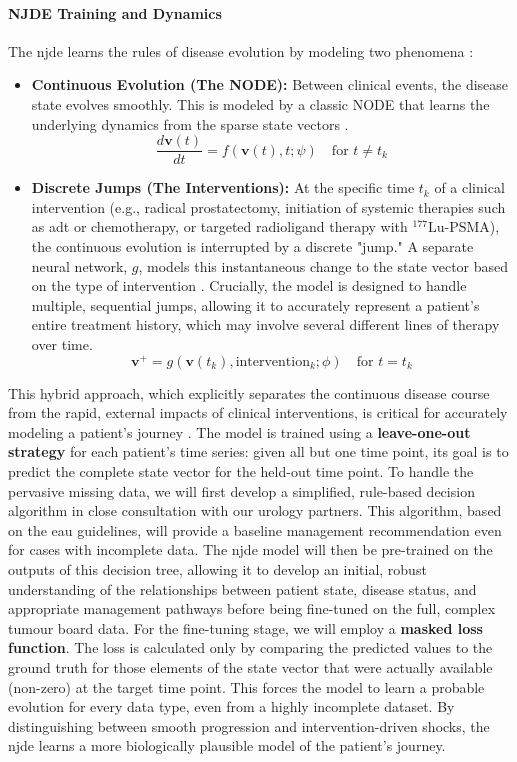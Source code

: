 \documentclass[11pt, a4paper]{article}
\begin{document}
\paragraph{NJDE Training and Dynamics}
The \gls{njde} learns the rules of disease evolution by modeling two phenomena \cite{GwakSim2020}:
\begin{itemize}
    \item \textbf{Continuous Evolution (The NODE):} Between clinical events, the disease state evolves smoothly. This is modeled by a classic NODE that learns the underlying dynamics from the sparse state vectors \cite{BergHasenclever2018}.
    $$ \frac{d\mathbf{v}(t)}{dt} = f(\mathbf{v}(t), t; \psi) \quad \text{for } t \neq t_k $$
    \item \textbf{Discrete Jumps (The Interventions):} At the specific time $t_k$ of a clinical intervention (e.g., radical prostatectomy, initiation of systemic therapies such as \gls{adt} or chemotherapy, or targeted radioligand therapy with $^{\text{177}}\text{Lu-PSMA}$), the continuous evolution is interrupted by a discrete "jump." A separate neural network, $g$, models this instantaneous change to the state vector based on the type of intervention \cite{CuchieroLarsson2019, AbushaqraXue2022}. Crucially, the model is designed to handle multiple, sequential jumps, allowing it to accurately represent a patient's entire treatment history, which may involve several different lines of therapy over time.
    $$ \mathbf{v}^+ = g(\mathbf{v}(t_k), \text{intervention}_k; \phi) \quad \text{for } t = t_k $$
\end{itemize}




This hybrid approach, which explicitly separates the continuous disease course from the rapid, external impacts of clinical interventions, is critical for accurately modeling a patient's journey \cite{GwakSim2020}. The model is trained using a \textbf{leave-one-out strategy} for each patient's time series: given all but one time point, its goal is to predict the complete state vector for the held-out time point. To handle the pervasive missing data, we will first develop a simplified, rule-based decision algorithm in close consultation with our urology partners. This algorithm, based on the \gls{eau} guidelines, will provide a baseline management recommendation even for cases with incomplete data. The \gls{njde} model will then be pre-trained on the outputs of this decision tree, allowing it to develop an initial, robust understanding of the relationships between patient state, disease status, and appropriate management pathways before being fine-tuned on the full, complex tumour board data. For the fine-tuning stage, we will employ a \textbf{masked loss function}. The loss is calculated only by comparing the predicted values to the ground truth for those elements of the state vector that were actually available (non-zero) at the target time point. This forces the model to learn a probable evolution for every data type, even from a highly incomplete dataset. By distinguishing between smooth progression and intervention-driven shocks, the \gls{njde} learns a more biologically plausible model of the patient's journey.
\end{document}
